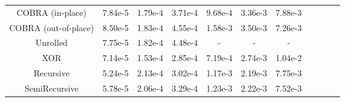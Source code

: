 \begin{tabular}{c|cccccccccc}{}
COBRA (in-place)     &  7.84e-5 &  1.79e-4 &  3.71e-4 &  9.68e-4 &  3.36e-3 &  7.88e-3 \\
COBRA (out-of-place) &  8.50e-5 &  1.83e-4 &  4.55e-4 &  1.58e-3 &  3.50e-3 &  7.26e-3 \\
Unrolled             &  7.75e-5 &  1.82e-4 &  4.48e-4 &        - &        - &        - \\
XOR                  &  7.14e-5 &  1.53e-4 &  2.85e-4 &  7.19e-4 &  2.74e-3 &  1.04e-2 \\
Recursive            &  5.24e-5 &  2.13e-4 &  3.02e-4 &  1.17e-3 &  2.19e-3 &  7.75e-3 \\
SemiRecursive        &  5.78e-5 &  2.06e-4 &  3.29e-4 &  1.23e-3 &  2.22e-3 &  7.52e-3 \\
\end{tabular}